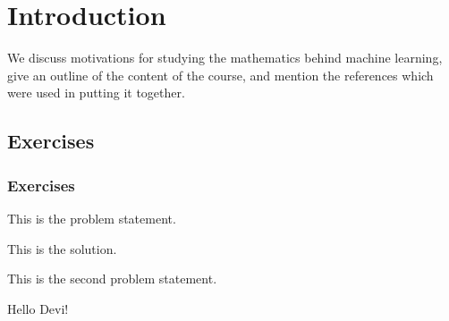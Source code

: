 \chapter{Introduction}

\begin{chout}
	We discuss motivations for studying the mathematics behind machine learning, give an outline of the content of the course, and mention the references which were used in putting it together.
\end{chout}

\section{Exercises}
\subsection{Exercises \basic}
\begin{exercise}
	\begin{problem}
	This is the problem statement.
	\end{problem}
	\begin{solution}
		This is the solution.
	\end{solution}
\end{exercise}

\begin{exercise}
	\begin{problem}
	This is the second problem statement.
	\end{problem}
	\begin{solution}
		Hello Devi!
	\end{solution}
\end{exercise}
